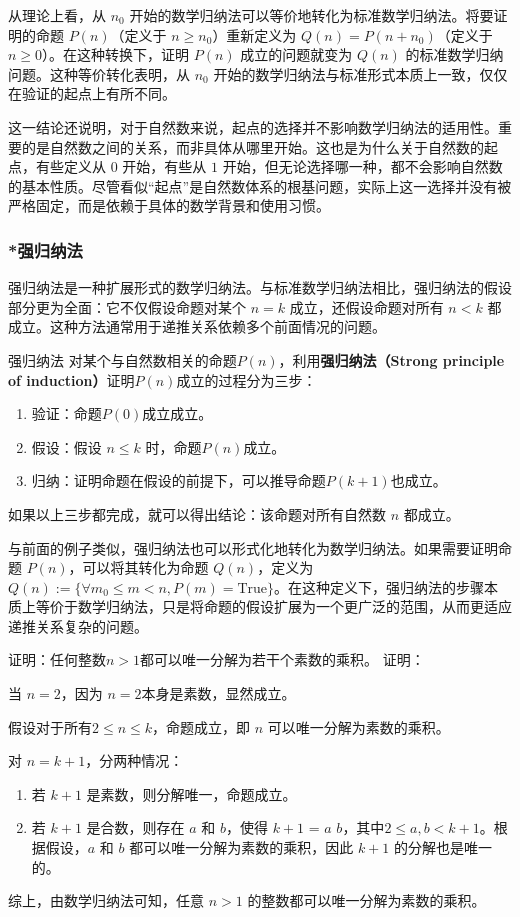 从理论上看，从 $n_0$ 开始的数学归纳法可以等价地转化为标准数学归纳法。将要证明的命题 $P(n)$（定义于 $n \geq n_0$）重新定义为 $Q(n) = P(n + n_0)$（定义于 $n \geq 0$）。在这种转换下，证明 $P(n)$ 成立的问题就变为 $Q(n)$ 的标准数学归纳问题。这种等价转化表明，从 $n_0$ 开始的数学归纳法与标准形式本质上一致，仅仅在验证的起点上有所不同。

这一结论还说明，对于自然数来说，起点的选择并不影响数学归纳法的适用性。重要的是自然数之间的关系，而非具体从哪里开始。这也是为什么关于自然数的起点，有些定义从 $0$ 开始，有些从 $1$ 开始，但无论选择哪一种，都不会影响自然数的基本性质。尽管看似“起点”是自然数体系的根基问题，实际上这一选择并没有被严格固定，而是依赖于具体的数学背景和使用习惯。

\subsubsection{*强归纳法}

强归纳法是一种扩展形式的数学归纳法。与标准数学归纳法相比，强归纳法的假设部分更为全面：它不仅假设命题对某个 $n = k$ 成立，还假设命题对所有 $n<k$ 都成立。这种方法通常用于递推关系依赖多个前面情况的问题。

\begin{definition}{强归纳法}
对某个与自然数相关的命题$P(n)$，利用\textbf{强归纳法（Strong principle of induction）}证明$P(n)$成立的过程分为三步：
\begin{enumerate}
\item 验证：命题$P(0)$成立成立。
\item 假设：假设 $n\leq k$ 时，命题$P(n)$成立。
\item 归纳：证明命题在假设的前提下，可以推导命题$P(k+1)$也成立。
\end{enumerate}
如果以上三步都完成，就可以得出结论：该命题对所有自然数 $n$ 都成立。
\end{definition}

与前面的例子类似，强归纳法也可以形式化地转化为数学归纳法。如果需要证明命题 $P(n)$，可以将其转化为命题 $Q(n)$，定义为 $Q(n) := \{\forall m_0 \leq m < n, P(m) = \text{True}\}$。在这种定义下，强归纳法的步骤本质上等价于数学归纳法，只是将命题的假设扩展为一个更广泛的范围，从而更适应递推关系复杂的问题。
\begin{example}{证明：任何整数$n>1$都可以唯一分解为若干个素数的乘积。}
证明：

当 $n = 2$，因为 $n = 2$本身是素数，显然成立。

假设对于所有$2 \leq n \leq k$，命题成立，即 $n$ 可以唯一分解为素数的乘积。

对 $n = k+1$，分两种情况：
\begin{enumerate}
\item 若 $k+1$ 是素数，则分解唯一，命题成立。
\item 若 $k+1$ 是合数，则存在 $a$ 和 $b$，使得 $k+1$ = $a$ \cdot $b$，其中$2 \leq a, b < k+1$。根据假设，$a$ 和 $b$ 都可以唯一分解为素数的乘积，因此 $k+1$ 的分解也是唯一的。
\end{enumerate}
综上，由数学归纳法可知，任意 $n>1$ 的整数都可以唯一分解为素数的乘积。
\end{example}

